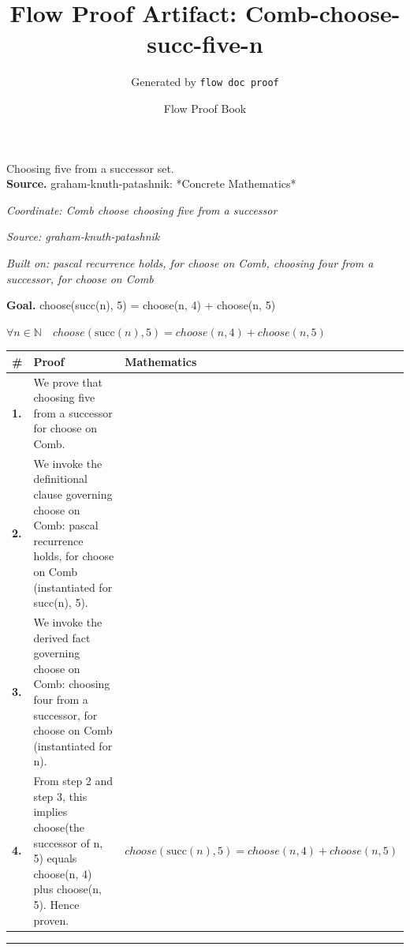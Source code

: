\documentclass[11pt]{article}
\title{Flow Proof Artifact: Comb-choose-succ-five-n}
\author{Generated by \texttt{flow doc proof}}
\date{Flow Proof Book}
\theoremstyle{definition}
\begin{document}
\maketitle
Choosing five from a successor set.\\[0.5em]
\textbf{Source.} graham-knuth-patashnik: *Concrete Mathematics*\\[0.5em]
\bigskip
{}\par
\smallskip\noindent\textit{Coordinate: Comb \cdot choose \cdot choosing five from a successor}\par
\smallskip\noindent\textit{Source: graham-knuth-patashnik}\par
\smallskip\noindent\textit{Built on: pascal recurrence holds, for choose on Comb, choosing four from a successor, for choose on Comb}\par
\medskip
\noindent\textbf{Goal.} choose(succ(n), 5) = choose(n, 4) + choose(n, 5)\par
\noindent$\displaystyle \forall n \in \mathbb{N}\quad choose(\mathrm{succ}(n), 5) = choose(n, 4) + choose(n, 5)$\par
\medskip
\noindent
\begin{tabular}{@{} >{\raggedright\arraybackslash}p{} >{\raggedright\arraybackslash}p{} >{\raggedleft\arraybackslash}p{} @{}}
\textbf{\#} & \textbf{Proof} & \textbf{Mathematics} \\
\midrule
\textbf{1.} & We prove that choosing five from a successor for choose on Comb. & \\[0.45em]
\textbf{2.} & We invoke the definitional clause governing choose on Comb: pascal recurrence holds, for choose on Comb (instantiated for succ(n), 5). & \\[0.45em]
\textbf{3.} & We invoke the derived fact governing choose on Comb: choosing four from a successor, for choose on Comb (instantiated for n). & \\[0.45em]
\textbf{4.} & From step 2 and step 3, this implies choose(the successor of n, 5) equals choose(n, 4) plus choose(n, 5). Hence proven. & $\displaystyle choose(\mathrm{succ}(n), 5) = choose(n, 4) + choose(n, 5)$ \\[0.45em]
\bottomrule
\end{tabular}
\label{thm:Comb-choose-choosing_five_from_a_successor}
\par\medskip\hrule
\end{document}
